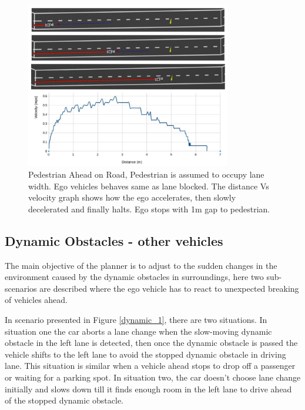 \begin{figure}
    \centering
    \includegraphics[width=0.8\textwidth]{Images/evaluation/stopping_pedestrian.jpg}
    \caption{Pedestrian Ahead on Road, Pedestrian is assumed to occupy lane width. Ego vehicles behaves same as lane blocked. The distance Vs velocity graph shows how the ego accelerates, then slowly decelerated and finally halts. Ego stops with 1m gap to pedestrian.}
    \label{pedestrian_ahead}
\end{figure}

\subsection{Dynamic Obstacles - other vehicles}
The main objective of the planner is to adjust to the sudden changes in the environment caused by the dynamic obstacles in surroundings, here two sub-scenarios are described where the ego vehicle has to react to unexpected breaking of vehicles ahead. 

In scenario presented in Figure \ref{dynamic_1}, there are two situations. In situation one the car aborts a lane change when the slow-moving dynamic obstacle in the left lane is detected, then once the dynamic obstacle is passed the vehicle shifts to the left lane to avoid the stopped dynamic obstacle in driving lane. This situation is similar when a vehicle ahead stops to drop off a passenger or waiting for a parking spot. In situation two, the car doesn't choose lane change initially and slows down till it finds enough room in the left lane to drive ahead of the stopped dynamic obstacle. 

\iffalse 

